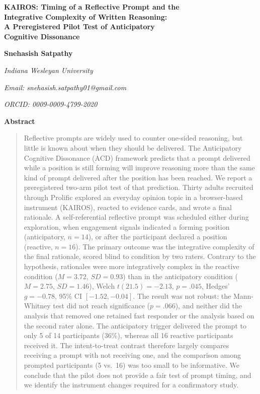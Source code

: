 \documentclass[12pt,letterpaper]{article}
\begin{document}
\begin{center}
{\LARGE\bfseries KAIROS: Timing of a Reflective Prompt and the\\[2pt] Integrative Complexity of Written Reasoning:\\[2pt] A Preregistered Pilot Test of Anticipatory\\[2pt] Cognitive Dissonance\par}
\vspace{14pt}
{\large\bfseries Snehasish Satpathy\par}
\vspace{2pt}
{\large\itshape Indiana Wesleyan University\par}
{\large\itshape Email: snehasish.satpathy01@gmail.com\par}
{\large\itshape ORCID: 0009-0009-4799-2020\par}
\end{center}
\vspace{10pt}

\begin{center}{\small\bfseries Abstract}\end{center}
\vspace{-6pt}
\begin{quote}\small
Reflective prompts are widely used to counter one-sided reasoning, but little is known about when they should be delivered. The Anticipatory Cognitive Dissonance (ACD) framework predicts that a prompt delivered while a position is still forming will improve reasoning more than the same kind of prompt delivered after the position has been reached. We report a preregistered two-arm pilot test of that prediction. Thirty adults recruited through Prolific explored an everyday opinion topic in a browser-based instrument (KAIROS), reacted to evidence cards, and wrote a final rationale. A self-referential reflective prompt was scheduled either during exploration, when engagement signals indicated a forming position (anticipatory, $n = 14$), or after the participant declared a position (reactive, $n = 16$). The primary outcome was the integrative complexity of the final rationale, scored blind to condition by two raters. Contrary to the hypothesis, rationales were more integratively complex in the reactive condition ($M = 3.72$, $SD = 0.93$) than in the anticipatory condition ($M = 2.75$, $SD = 1.46$), Welch $t(21.5) = -2.13$, $p = .045$, Hedges' $g = -0.78$, 95\% CI $[-1.52, -0.04]$. The result was not robust: the Mann-Whitney test did not reach significance ($p = .066$), and neither did the analysis that removed one retained fast responder or the analysis based on the second rater alone. The anticipatory trigger delivered the prompt to only 5 of 14 participants (36\%), whereas all 16 reactive participants received it. The intent-to-treat contrast therefore largely compares receiving a prompt with not receiving one, and the comparison among prompted participants (5 vs.\ 16) was too small to be informative. We conclude that the pilot does not provide a fair test of prompt timing, and we identify the instrument changes required for a confirmatory study.
\end{quote}
\end{document}
